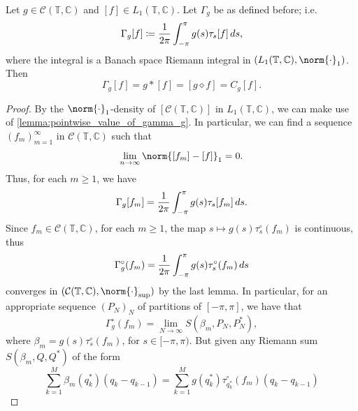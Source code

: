 \documentclass[notoc,notitlepage]{tufte-book}
\begin{document}
\begin{thm}\label{thm:equivalence_of_gamma_g_and_c_g_}
  Let $g \in \mathcal{C}(\mathbb{T}, \mathbb{C})$
  and $[f] \in L_1(\mathbb{T}, \mathbb{C})$.
  Let $\Gamma_g$ be as defined before; i.e.
  \begin{equation*}
    \Gamma_g[f] \coloneqq \frac{1}{2\pi} \int_{-\pi}^{\pi} g(s) \tau_s[f] \mathop{}\!d{s},
  \end{equation*}
  where the integral is a Banach space Riemann integral in
  $(L_1(\mathbb{T}, \mathbb{C}), \norm{\cdot}_1)$.
  Then
  \begin{equation*}
    \Gamma_g[f] = g * [f] = [g \diamond f] = C_g[f].
  \end{equation*}
\end{thm}

\begin{proof}
  By the $\norm{\cdot}_1$-density of
  $[\mathcal{C}(\mathbb{T}, \mathbb{C})]$ in $L_1(\mathbb{T}, \mathbb{C})$,
  we can make use of \cref{lemma:pointwise_value_of_gamma_g}.
  In particular, we can find a sequence $(f_m)_{m=1}^{\infty}$
  in $\mathcal{C}(\mathbb{T}, \mathbb{C})$ such that
  \begin{equation*}
    \lim_{n \to \infty} \norm{[f_m] - [f]}_1 = 0.
  \end{equation*}
  Thus, for each $m \geq 1$, we have
  \begin{equation*}
    \Gamma_g[f_m] = \frac{1}{2\pi} \int_{-\pi}^{\pi} g(s) \tau_s[f_m] \mathop{}\!d{s}.
  \end{equation*}
  Since $f_m \in \mathcal{C}(\mathbb{T}, \mathbb{C})$, for each $m \geq 1$,
  the map $s \mapsto g(s) \tau_s^\circ(f_m)$ is continuous,
  thus
  \begin{equation*}
    \Gamma_g^\circ(f_m) = \frac{1}{2\pi} \int_{-\pi}^{\pi} g(s) \tau_s^\circ(f_m) \mathop{}\!d{s}
  \end{equation*}
  converges in $(\mathcal{C}(\mathbb{T}, \mathbb{C}), \norm{\cdot}_{\sup})$ by the last lemma.
  In particular, for an appropriate sequence $(P_N)_N$
  of partitions of $[-\pi, \pi]$, we have that
  \begin{equation*}
    \Gamma_g^\circ(f_m) = \lim_{N \to \infty} S(\beta_m, P_N, P_N^*),
  \end{equation*}
  where $\beta_m = g(s) \tau_s^\circ(f_m)$, for $s \in [-\pi, \pi)$.
  But given any Riemann sum $S(\beta_m, Q, Q^*)$ of the form
  \begin{equation*}
    \sum_{k=1}^{M} \beta_m(q_k^*)(q_k - q_{k-1})
    = \sum_{k=1}^{M} g(q_k^*)\tau_{q_k^*}^\circ(f_m)(q_k - q_{k-1})

\end{equation*}
\end{proof}
\end{document}

